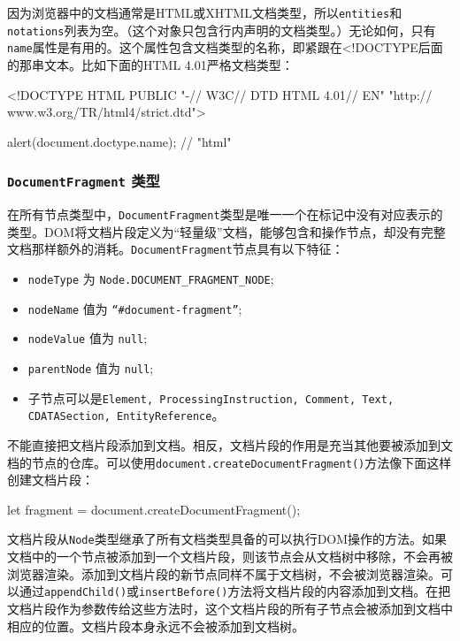 因为浏览器中的文档通常是HTML或XHTML文档类型，所以\texttt{entities}和\texttt{notations}列表为空。（这个对象只包含行内声明的文档类型。）无论如何，只有\texttt{name}属性是有用的。这个属性包含文档类型的名称，即紧跟在<!DOCTYPE后面的那串文本。比如下面的HTML 4.01严格文档类型：

\begin{HTML}
<!DOCTYPE HTML PUBLIC "-// W3C// DTD HTML 4.01// EN"   
    "http:// www.w3.org/TR/html4/strict.dtd"> 
\end{HTML}

\begin{JavaScript}
alert(document.doctype.name); // "html" 
\end{JavaScript}

\subsubsection*{\texttt{DocumentFragment} 类型}

在所有节点类型中，\texttt{DocumentFragment}类型是唯一一个在标记中没有对应表示的类型。DOM将文档片段定义为“轻量级”文档，能够包含和操作节点，却没有完整文档那样额外的消耗。\texttt{DocumentFragment}节点具有以下特征：

\begin{itemize}
    \item \texttt{nodeType} 为 \texttt{Node.DOCUMENT\_FRAGMENT\_NODE};
    \item \texttt{nodeName} 值为 \texttt{``\#document-fragment''};
    \item \texttt{nodeValue} 值为 \texttt{null};
    \item \texttt{parentNode} 值为 \texttt{null};
    \item 子节点可以是\texttt{Element, ProcessingInstruction, Comment, Text, CDATASection, EntityReference}。
\end{itemize}

不能直接把文档片段添加到文档。相反，文档片段的作用是充当其他要被添加到文档的节点的仓库。可以使用\texttt{document.createDocumentFragment()}方法像下面这样创建文档片段：

\begin{JavaScript}
let fragment = document.createDocumentFragment(); 
\end{JavaScript}

文档片段从\texttt{Node}类型继承了所有文档类型具备的可以执行DOM操作的方法。如果文档中的一个节点被添加到一个文档片段，则该节点会从文档树中移除，不会再被浏览器渲染。添加到文档片段的新节点同样不属于文档树，不会被浏览器渲染。可以通过\texttt{appendChild()}或\texttt{insertBefore()}方法将文档片段的内容添加到文档。在把文档片段作为参数传给这些方法时，这个文档片段的所有子节点会被添加到文档中相应的位置。文档片段本身永远不会被添加到文档树。

